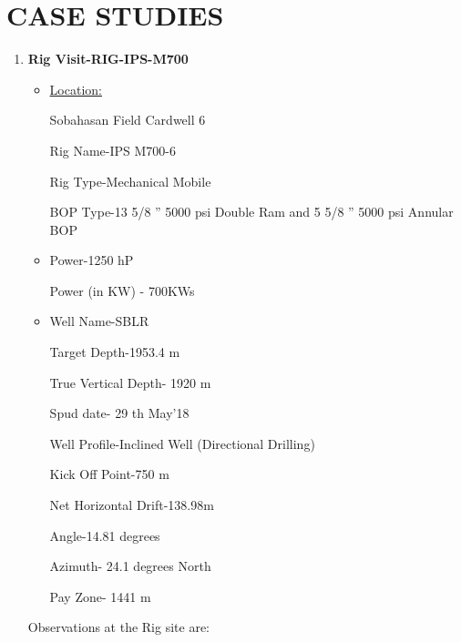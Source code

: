\chapter{CASE STUDIES}


\begin{enumerate}

\item \textbf{Rig Visit-RIG-IPS-M700}

\begin{itemize}

\item \underline{Location:} 

Sobahasan Field Cardwell 6

Rig Name-IPS M700-6

Rig Type-Mechanical Mobile

BOP Type-13 5/8 ” 5000 psi Double Ram and 5 5/8 ” 5000 psi Annular BOP

\vspace{1em}

\item {}

Power-1250 hP

Power (in KW) - 700KWs

\vspace{1em}

\item {}

Well Name-SBLR

Target Depth-1953.4 m

True Vertical Depth- 1920 m

Spud date- 29 th May’18

Well Profile-Inclined Well (Directional Drilling)

Kick Off Point-750 m

Net Horizontal Drift-138.98m

Angle-14.81 degrees

Azimuth- 24.1 degrees North

Pay Zone- 1441 m

\end{itemize}


\noindent Observations at the Rig site are:


\end{enumerate}
